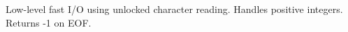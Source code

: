 
Low-level fast I/O using unlocked character reading. Handles positive integers. Returns -1 on EOF.


